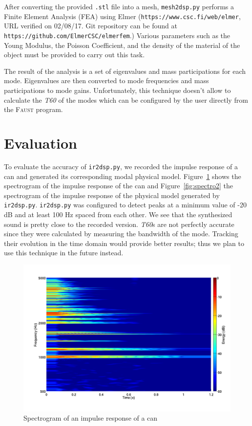 \documentclass[11pt,a4paper]{article}
\newcommand{\f}{\textsc{Faust}}
\begin{document}
After converting the provided \texttt{.stl} file into a mesh, \texttt{mesh2dsp.py} performs a Finite Element Analysis (FEA) using Elmer (\texttt{https://www.csc.fi/web/elmer}, URL verified on 02/08/17. Git repository can be found at \texttt{https://github.com/ElmerCSC/elmerfem}.) Various parameters such as the Young Modulus, the Poisson Coefficient, and the density of the material of the object must be provided to carry out this task.

The result of the analysis is a set of eigenvalues and mass participations for each mode. Eigenvalues are then converted to mode frequencies and mass participations to mode gains. Unfortunately, this technique doesn't allow to calculate the \textit{T60} of the modes which can be configured by the user directly from the \f{} program. 

\section{Evaluation}

To evaluate the accuracy of \texttt{ir2dsp.py}, we recorded the impulse response of a can and generated its corresponding modal physical model. Figure~\ref{fig:spectro1} shows the spectrogram of the impulse response of the can and Figure~\ref{fig:spectro2} the spectrogram of the impulse response of the physical model generated by \texttt{ir2dsp.py}. \texttt{ir2dsp.py} was configured to detect peaks at a minimum value of -20 dB and at least 100 Hz spaced from each other. We see that the synthesized sound is pretty close to the recorded version. \textit{T60}s are not perfectly accurate since they were calculated by measuring the bandwidth of the mode. Tracking their evolution in the time domain would provide better results; thus we plan to use this technique in the future instead.

\begin{figure}[htbp]
  \centering
  \includegraphics[width=\columnwidth]{pictures/canIR}
  \caption{Spectrogram of an impulse response of a can}
  \label{fig:spectro1}
\end{figure}
\end{document}

